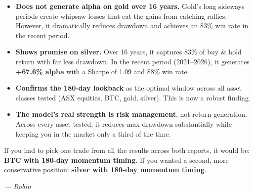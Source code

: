 \documentclass[11pt,a4paper]{article}
\begin{document}
\begin{itemize}[leftmargin=2em]
    \item \textbf{Does not generate alpha on gold over 16 years.}
          Gold's long sideways periods create whipsaw losses that eat
          the gains from catching rallies. However, it dramatically
          reduces drawdown and achieves an 83\% win rate in the recent
          period.

    \item \textbf{Shows promise on silver.} Over 16 years, it captures
          83\% of buy \& hold return with far less drawdown. In the
          recent period (2021--2026), it generates \textbf{+67.6\% alpha}
          with a Sharpe of 1.09 and 88\% win rate.

    \item \textbf{Confirms the 180-day lookback} as the optimal window
          across all asset classes tested (ASX equities, BTC, gold,
          silver). This is now a robust finding.

    \item \textbf{The model's real strength is risk management}, not
          return generation. Across every asset tested, it reduces max
          drawdown substantially while keeping you in the market only
          a third of the time.
\end{itemize}

If you had to pick one trade from all the results across both reports,
it would be: \textbf{BTC with 180-day momentum timing}. If you wanted
a second, more conservative position: \textbf{silver with 180-day
momentum timing}.

\vspace{2em}
\begin{center}
\textit{--- Robin}
\end{center}
\end{document}
